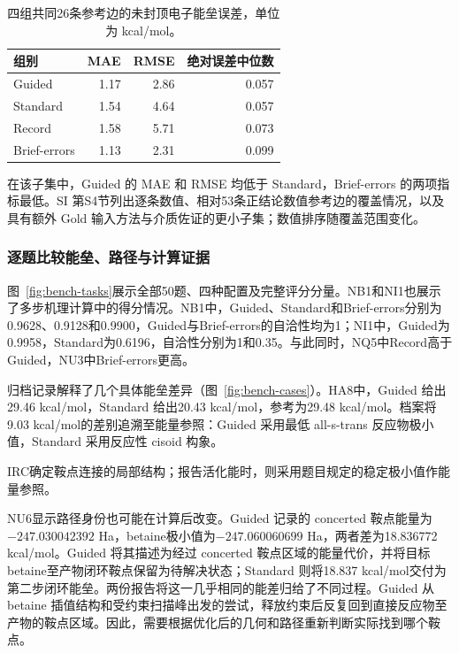 \begin{table}[tbp]
\centering\small
\caption{四组共同26条参考边的未封顶电子能垒误差，单位为 kcal/mol。}
\label{tab:uncapped-barrier-errors}
\begin{tabular}{lrrr}
\toprule
组别 & MAE & RMSE & 绝对误差中位数 \\
\midrule
Guided & 1.17 & 2.86 & 0.057 \\
Standard & 1.54 & 4.64 & 0.057 \\
Record & 1.58 & 5.71 & 0.073 \\
Brief-errors & 1.13 & 2.31 & 0.099 \\
\bottomrule
\end{tabular}
\end{table}

在该子集中，Guided 的 MAE 和 RMSE 均低于 Standard，Brief-errors 的两项指标最低。SI 第S4节列出逐条数值、相对53条正结论数值参考边的覆盖情况，以及具有额外 Gold 输入方法与介质佐证的更小子集；数值排序随覆盖范围变化。

\subsubsection{逐题比较能垒、路径与计算证据}

图~\ref{fig:bench-tasks}展示全部50题、四种配置及完整评分分量。NB1和NI1也展示了多步机理计算中的得分情况。NB1中，Guided、Standard和Brief-errors分别为0.9628、0.9128和0.9900，Guided与Brief-errors的自洽性均为1；NI1中，Guided为0.9958，Standard为0.6196，自洽性分别为1和0.35。与此同时，NQ5中Record高于Guided，NU3中Brief-errors更高。

归档记录解释了几个具体能垒差异（图~\ref{fig:bench-cases}）。HA8中，Guided 给出29.46 kcal/mol，Standard 给出20.43 kcal/mol，参考为29.48 kcal/mol。档案将9.03 kcal/mol的差别追溯至能量参照：Guided 采用最低 all-s-trans 反应物极小值，Standard 采用反应性 cisoid 构象。

IRC确定鞍点连接的局部结构；报告活化能时，则采用题目规定的稳定极小值作能量参照。

NU6显示路径身份也可能在计算后改变。Guided 记录的 concerted 鞍点能量为$-247.030042392$ Ha，betaine极小值为$-247.060060699$ Ha，两者差为18.836772 kcal/mol。Guided 将其描述为经过 concerted 鞍点区域的能量代价，并将目标 betaine至产物闭环鞍点保留为待解决状态；Standard 则将18.837 kcal/mol交付为第二步闭环能垒。两份报告将这一几乎相同的能差归给了不同过程。Guided 从 betaine 插值结构和受约束扫描峰出发的尝试，释放约束后反复回到直接反应物至产物的鞍点区域。因此，需要根据优化后的几何和路径重新判断实际找到哪个鞍点。

